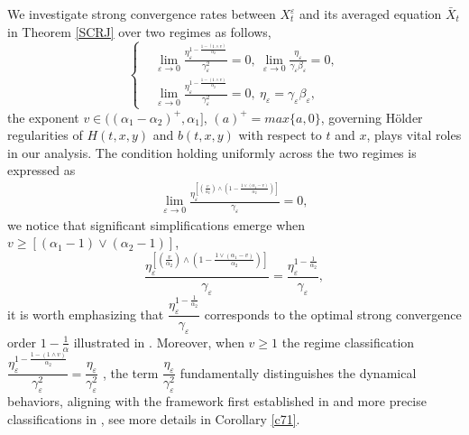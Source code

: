 \documentclass[11pt,reqno]{amsart}
\numberwithin{equation}{section}
\begin{document}
We investigate strong convergence rates between  $X_{t}^{\varepsilon}$ and its averaged equation $\bar{X}_{t}$ in Theorem \ref{SCRJ} over two regimes as follows,
\begin{equation}\label{1.1-1}
	\left\{
	\begin{aligned}
		&\lim\limits_{\varepsilon \rightarrow0} \frac{\eta_{\varepsilon}^{1-\frac{1-(1\wedge v)}{\alpha_{2}}}}{\gamma_{\varepsilon}^{2}}=0,\ \lim\limits_{\varepsilon \rightarrow0}\frac{\eta_{\varepsilon}}{\gamma_{\varepsilon}\beta_{\varepsilon} }=0,\\
		&\lim\limits_{\varepsilon \rightarrow0} \frac{\eta_{\varepsilon}^{1-\frac{1-(1\wedge v)}{\alpha_{2}}}}{\gamma_{\varepsilon}^{2}}=0,\ \eta_{\varepsilon}=\gamma_{\varepsilon}\beta_{\varepsilon},
	\end{aligned}
	\right.
\end{equation}
 the exponent $v\in((\alpha_{1}-\alpha_{2})^{+},\alpha_{1}]$, $(a)^{+}=max\{a, 0\}$, governing Hölder regularities of $H(t,x,y)$ and $b(t,x,y)$ with respect to $t$ and $x$, plays vital roles in our analysis. The condition  holding uniformly‌ across the two regimes is expressed as
\begin{equation}
	\begin{aligned}
		 \lim\limits_{\varepsilon \rightarrow0}\frac{\eta_{\varepsilon}^{\left[ \left( \frac{v}{\alpha_{2}}\right) \wedge \left( 1-\frac{1\vee(\alpha_{1}-v)}{\alpha_{2}}\right) \right] }}{\gamma_{\varepsilon} } =0,
	\end{aligned}\nonumber
\end{equation}
 we notice that significant simplifications emerge when  $v\geq[(\alpha_{1}-1)\vee (\alpha_{2}-1)]$,  \begin{equation}\label{1.5-2}
 	  \frac{\eta_{\varepsilon}^{\left[ \left( \frac{v}{\alpha_{2}}\right) \wedge \left( 1-\frac{1\vee(\alpha_{1}-v)}{\alpha_{2}}\right) \right] }}{\gamma_{\varepsilon} } =\frac{\eta_{\varepsilon}^{1-\frac{1}{\alpha_{2}}}}{\gamma_{\varepsilon} },
 \end{equation}
 it is worth emphasizing that  $\dfrac{\eta_{\varepsilon}^{1-\frac{1}{\alpha_{2}}}}{\gamma_{\varepsilon} }$ corresponds to the optimal strong convergence order $1-\frac{1}{\alpha}$ %
 illustrated in \cite{SXX}. Moreover, when $v\geq1$ the regime classification  $\dfrac{\eta_{\varepsilon}^{1-\frac{1-(1\wedge v)}{\alpha_{2}}}}{\gamma_{\varepsilon}^{2}}= \dfrac{\eta_{\varepsilon}}{\gamma_{\varepsilon}^{2}}$ , the term $\dfrac{\eta_{\varepsilon}}{\gamma_{\varepsilon}^{2}}$  fundamentally distinguishes the dynamical behaviors,  aligning with the framework first established in \cite{EY2,EY3} and more precise classifications in \cite{RX}, see more details in Corollary \ref{c71}.
\end{document}
